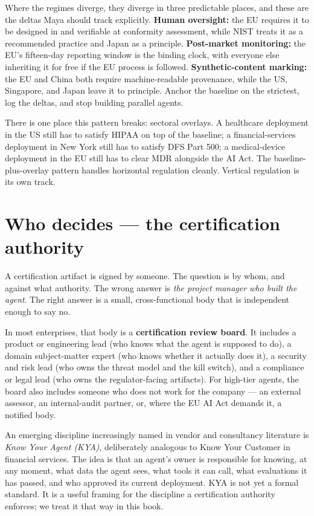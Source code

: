 Where the regimes diverge, they diverge in three predictable places, and these are the deltas Maya should track explicitly. \textbf{Human oversight:} the EU requires it to be designed in and verifiable at conformity assessment, while NIST treats it as a recommended practice and Japan as a principle. \textbf{Post-market monitoring:} the EU's fifteen-day reporting window is the binding clock, with everyone else inheriting it for free if the EU process is followed. \textbf{Synthetic-content marking:} the EU and China both require machine-readable provenance, while the US, Singapore, and Japan leave it to principle. Anchor the baseline on the strictest, log the deltas, and stop building parallel agents.

There is one place this pattern breaks: sectoral overlays. A healthcare deployment in the US still has to satisfy HIPAA on top of the baseline; a financial-services deployment in New York still has to satisfy DFS Part 500; a medical-device deployment in the EU still has to clear MDR alongside the AI Act. The baseline-plus-overlay pattern handles horizontal regulation cleanly. Vertical regulation is its own track.

\section{Who decides --- the certification authority}

A certification artifact is signed by someone. The question is by whom, and against what authority. The wrong answer is \textit{the project manager who built the agent}. The right answer is a small, cross-functional body that is independent enough to say no.

In most enterprises, that body is a \textbf{certification review board}. It includes a product or engineering lead (who knows what the agent is supposed to do), a domain subject-matter expert (who knows whether it actually does it), a security and risk lead (who owns the threat model and the kill switch), and a compliance or legal lead (who owns the regulator-facing artifacts). For high-tier agents, the board also includes someone who does not work for the company --- an external assessor, an internal-audit partner, or, where the EU AI Act demands it, a notified body.

An emerging discipline increasingly named in vendor and consultancy literature is \textit{Know Your Agent (KYA)}, deliberately analogous to Know Your Customer in financial services. The idea is that an agent's owner is responsible for knowing, at any moment, what data the agent sees, what tools it can call, what evaluations it has passed, and who approved its current deployment. KYA is not yet a formal standard. It is a useful framing for the discipline a certification authority enforces; we treat it that way in this book.

